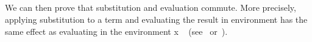 \begin{code}
%
\>[1]\AgdaSpace{}%
\AgdaSymbol{:}\AgdaSpace{}%
\AgdaSymbol{\{}\AgdaSpace{}%
\AgdaSymbol{:}\AgdaSpace{}%
\AgdaSpace{}%
\AgdaSymbol{\}}\AgdaSpace{}%
\AgdaSpace{}%
\AgdaSpace{}%
\AgdaSymbol{(}\AgdaSpace{}%
\AgdaSymbol{\{}\AgdaSpace{}%
\AgdaSymbol{=}\AgdaSpace{}%
\AgdaSymbol{\})}\<%
\\
%
\>[1]%
\>[9]\AgdaSpace{}%
\AgdaSymbol{=}\AgdaSpace{}%
\AgdaSpace{}%
\AgdaBound{\AgdaUnderscore{}}%
\>[35]\AgdaSpace{}%
\<%
\\
%
\>[1]%
\>[9]\AgdaSpace{}%
\AgdaSymbol{=}\AgdaSpace{}%
\AgdaSpace{}%
\AgdaSpace{}%
%
\>[35]\AgdaSpace{}%
\AgdaSpace{}%
\AgdaSymbol{(}\AgdaSpace{}%
\AgdaSymbol{)}\<%
\\
%
\>[1]%
\>[9]\AgdaSpace{}%
\AgdaSymbol{=}\AgdaSpace{}%
\AgdaSpace{}%
\AgdaSpace{}%
\AgdaSpace{}%
%
\>[35]\AgdaSpace{}%
\AgdaSpace{}%
\AgdaSymbol{(}\AgdaSpace{}%
\AgdaSymbol{)}\AgdaSpace{}%
\AgdaSymbol{(}\AgdaSpace{}%
\AgdaSymbol{)}\<%
\\
\>[0]\<%
\end{code}
\fi

We can then prove that substitution and evaluation commute.  More precisely,
applying substitution  to a term 
and evaluating the result in environment  has the same effect as evaluating
 in the environment  \ab x  ~
 (see~\cite{Abel:2021} or~\cite[Lem.~3.3.11]{Mitchell:1996}).

